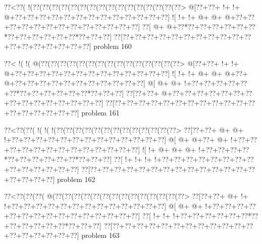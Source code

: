 \vbox{\vbox{\goo
\0??<\0??(\- !(\0??(\0??(\0??(\0??(\0??(\0??(\0??(\0??(\0??(\0??(\0??(\0??(\0??(\0??(\0??(\0??>
\- @[\0??+\0??+\- !+\- !+\- @+\0??+\0??+\0??+\0??+\0??+\0??+\0??+\0??+\0??+\0??+\0??+\0??+\0??]
\- ![\- !+\- !+\- @+\- @+\- @+\0??+\0??+\0??+\0??+\0??+\0??+\0??+\0??+\0??+\0??+\0??+\0??+\0??]
\0??[\- @+\- @+\0??*\0??+\0??+\0??+\0??+\0??+\0??*\0??+\0??+\0??+\0??+\0??+\0??*\0??+\0??+\0??]
\0??[\0??+\0??+\0??+\0??+\0??+\0??+\0??+\0??+\0??+\0??+\0??+\0??+\0??+\0??+\0??+\0??+\0??+\0??]
}
\hfil problem 160\hfil\break
}



\vbox{\vbox{\goo
\0??<\- !(\- !(\- @(\0??(\0??(\0??(\0??(\0??(\0??(\0??(\0??(\0??(\0??(\0??(\0??(\0??(\0??(\0??>
\- @[\0??+\0??+\- !+\- !+\- @+\0??+\0??+\0??+\0??+\0??+\0??+\0??+\0??+\0??+\0??+\0??+\0??+\0??]
\- ![\- !+\- !+\- @+\- @+\- @+\0??+\- @+\0??+\0??+\0??+\0??+\0??+\0??+\0??+\0??+\0??+\0??+\0??]
\- @[\- @+\- @+\- !+\0??+\0??+\0??+\0??+\0??+\0??*\0??+\0??+\0??+\0??+\0??+\0??*\0??+\0??+\0??]
\0??[\0??+\0??+\- @+\0??+\0??+\0??+\0??+\0??+\0??+\0??+\0??+\0??+\0??+\0??+\0??+\0??+\0??+\0??]
\0??[\0??+\0??+\0??+\0??+\0??+\0??+\0??+\0??+\0??+\0??+\0??+\0??+\0??+\0??+\0??+\0??+\0??+\0??]
}
\hfil problem 161\hfil\break
}



\vbox{\vbox{\goo
\0??<\0??(\0??(\- !(\- !(\- !(\0??(\0??(\0??(\0??(\0??(\0??(\0??(\0??(\0??(\0??(\0??(\0??(\0??>
\0??[\0??+\0??+\- @+\- @+\- !+\0??+\0??+\0??+\0??+\0??+\0??+\0??+\0??+\0??+\0??+\0??+\0??+\0??]
\- @[\- @+\- @+\0??+\- @+\- !+\0??+\0??+\0??+\0??+\0??+\0??+\0??+\0??+\0??+\0??+\0??+\0??+\0??]
\- ![\- !+\- @+\- @+\- @+\- !+\0??+\0??+\0??+\0??*\0??+\0??+\0??+\0??+\0??+\0??*\0??+\0??+\0??]
\0??[\- !+\- !+\- !+\- !+\0??+\0??+\0??+\0??+\0??+\0??+\0??+\0??+\0??+\0??+\0??+\0??+\0??+\0??]
\0??[\0??+\0??+\0??+\0??+\0??+\0??+\0??+\0??+\0??+\0??+\0??+\0??+\0??+\0??+\0??+\0??+\0??+\0??]
}
\hfil problem 162\hfil\break
}



\vbox{\vbox{\goo
\0??<\0??(\0??(\0??(\- @(\0??(\0??(\0??(\0??(\0??(\0??(\0??(\0??(\0??(\0??(\0??(\0??(\0??(\0??>
\0??[\0??+\0??+\- @+\- !+\- !+\0??+\0??+\0??+\0??+\0??+\0??+\0??+\0??+\0??+\0??+\0??+\0??+\0??]
\- @[\- @+\- @+\- !+\0??+\0??+\0??+\0??+\0??+\0??+\0??+\0??+\0??+\0??+\0??+\0??+\0??+\0??+\0??]
\0??[\- !+\- !+\- !+\0??+\0??+\0??+\0??+\0??+\0??*\0??+\0??+\0??+\0??+\0??+\0??*\0??+\0??+\0??]
\0??[\0??+\0??+\0??+\0??+\0??+\0??+\0??+\0??+\0??+\0??+\0??+\0??+\0??+\0??+\0??+\0??+\0??+\0??]
}
\hfil problem 163\hfil\break
}



